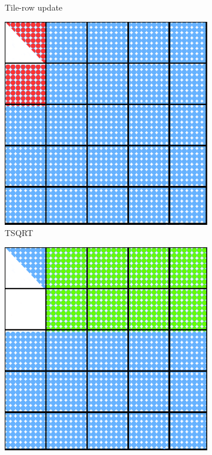 \begin{figure}[h!]
\begin{subfigure}{0.2 \textwidth}
    \caption{\label{fig:tile_qr_update_1}Tile-row update}
  \end{subfigure}
  \hfill
  \begin{subfigure}{0.2 \textwidth}
    \includegraphics[width=\textwidth]{fig/SVD_tile_3_grid}
    \caption{\label{fig:tile_qr_2}TSQRT}
  \end{subfigure}
  \hfill
  \begin{subfigure}{0.2 \textwidth}
    \includegraphics[width=\textwidth]{fig/SVD_tile_4_grid}

\end{subfigure}
\end{figure}

